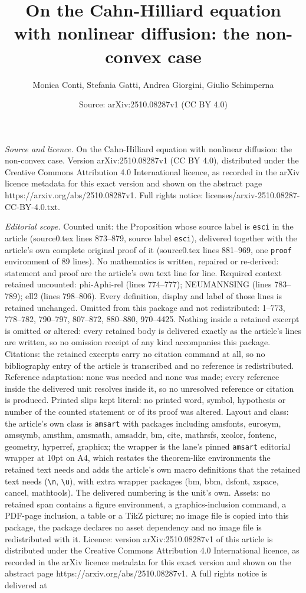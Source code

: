 \documentclass[10pt,a4paper]{amsart}
\title[On the Cahn-Hilliard equation with nonlinear diffusion: the ]{On the Cahn-Hilliard equation with nonlinear diffusion: the non-convex case}
\author{Monica Conti, Stefania Gatti, Andrea Giorgini, Giulio Schimperna}
\date{Source: arXiv:2510.08287v1 (CC BY 4.0)}
\begin{document}
\maketitle

\noindent\emph{Source and licence.} On the Cahn-Hilliard equation with nonlinear diffusion: the non-convex case. Version arXiv:2510.08287v1 (CC BY 4.0), distributed under the Creative Commons Attribution 4.0 International licence, as recorded in the arXiv licence metadata for this exact version and shown on the abstract page https://arxiv.org/abs/2510.08287v1. Full rights notice: licenses/arxiv-2510.08287-CC-BY-4.0.txt.\par\smallskip

\noindent\textit{Editorial scope.} Counted unit: the Proposition whose source label is \texttt{esci} in the article (source0.tex lines 873--879, source label \texttt{esci}), delivered together with the article's own complete original proof of it (source0.tex lines 881--969, one \texttt{proof} environment of 89 lines). No mathematics is written, repaired or re-derived: statement and proof are the article's own text line for line. Required context retained uncounted: phi-Aphi-rel (lines 774--777); NEUMANNSING (lines 783--789); ell2 (lines 798--806). Every definition, display and label of those lines is retained unchanged. Omitted from this package and not redistributed: 1--773, 778--782, 790--797, 807--872, 880--880, 970--4425. Nothing inside a retained excerpt is omitted or altered: every retained body is delivered exactly as the article's lines are written, so no omission receipt of any kind accompanies this package. Citations: the retained excerpts carry no citation command at all, so no bibliography entry of the article is transcribed and no reference is redistributed. Reference adaptation: none was needed and none was made; every reference inside the delivered unit resolves inside it, so no unresolved reference or citation is produced. Printed slips kept literal: no printed word, symbol, hypothesis or number of the counted statement or of its proof was altered. Layout and class: the article's own class is \texttt{amsart} with packages including amsfonts, eurosym, amssymb, amsthm, amsmath, amsaddr, bm, cite, mathrsfs, xcolor, fontenc, geometry, hyperref, graphicx; the wrapper is the lane's pinned \texttt{amsart} editorial wrapper at 10pt on A4, which restates the theorem-like environments the retained text needs and adds the article's own macro definitions that the retained text needs (\texttt{\textbackslash n}, \texttt{\textbackslash u}), with extra wrapper packages (bm, bbm, dsfont, xspace, cancel, mathtools). The delivered numbering is the unit's own. Assets: no retained span contains a figure environment, a graphics-inclusion command, a PDF-page inclusion, a table or a TikZ picture; no image file is copied into this package, the package declares no asset dependency and no image file is redistributed with it. Licence: version arXiv:2510.08287v1 of this article is distributed under the Creative Commons Attribution 4.0 International licence, as recorded in the arXiv licence metadata for this exact version and shown on the abstract page https://arxiv.org/abs/2510.08287v1. A full rights notice is delivered at 
\end{document}
